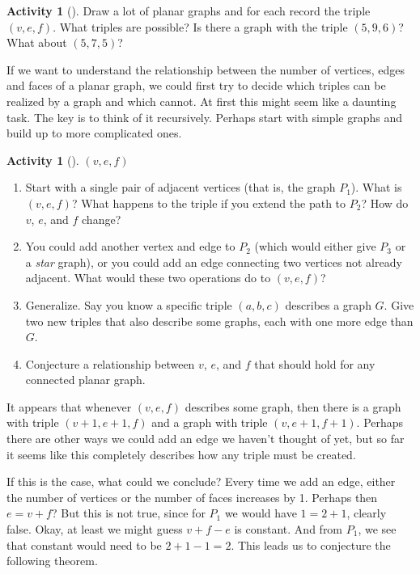 \documentclass[10pt,]{book}
\theoremstyle{plain}
\theoremstyle{definition}
\theoremstyle{definition}
\theoremstyle{definition}
\newtheorem{activity}[project]{Activity}
\numberwithin{equation}{chapter}
\begin{document}
\begin{activity}[]\label{activity-15}
\hypertarget{p-212}{}%
Draw a lot of planar graphs and for each record the triple \((v,e,f)\).  What triples are possible? Is there a graph with the triple \((5, 9, 6)\)?  What about \((5,7,5)\)?%
\end{activity}
\hypertarget{p-213}{}%
If we want to understand the relationship between the number of vertices, edges and faces of a planar graph, we could first try to decide which triples can be realized by a graph and which cannot.  At first this might seem like a daunting task.  The key is to think of it recursively.  Perhaps start with simple graphs and build up to more complicated ones.%
\begin{activity}[]\label{activity-16}
\((v,e,f)\)\begin{enumerate}[font=\bfseries,label=(\alph*),ref=\alph*]
\item\label{task-20} \hypertarget{p-214}{}%
Start with a single pair of adjacent vertices (that is, the graph \(P_1\)).  What is \((v,e,f)\)?  What happens to the triple if you extend the path to \(P_2\)?  How do \(v\), \(e\), and \(f\) change?%
\item\label{task-21} \hypertarget{p-215}{}%
You could add another vertex and edge to \(P_2\) (which would either give \(P_3\) or a \emph{star} graph), or you could add an edge connecting two vertices not already adjacent.  What would these two operations do to \((v,e,f)\)?%
\item\label{task-22} \hypertarget{p-216}{}%
Generalize.  Say you know a specific triple \((a,b,c)\) describes a graph \(G\).  Give two new triples that also describe some graphs, each with one more edge than \(G\).%
\item\label{task-23} \hypertarget{p-217}{}%
Conjecture a relationship between \(v\), \(e\), and \(f\) that should hold for any connected planar graph.%
\end{enumerate}
\end{activity}
\hypertarget{p-218}{}%
It appears that whenever \((v,e,f)\) describes some graph, then there is a graph with triple \((v+1, e+1, f)\) and a graph with triple \((v,e+1, f+1)\).  Perhaps there are other ways we could add an edge we haven't thought of yet, but so far it seems like this completely describes how any triple must be created.%
\par
\hypertarget{p-219}{}%
If this is the case, what could we conclude?  Every time we add an edge, either the number of vertices or the number of faces increases by 1.  Perhaps then \(e = v + f\)?  But this is not true, since for \(P_1\) we would have \(1 = 2 + 1\), clearly false.  Okay, at least we might guess \(v + f - e\) is constant.  And from \(P_1\), we see that constant would need to be \(2 + 1 - 1 = 2\).  This leads us to conjecture the following theorem.%
\end{document}
